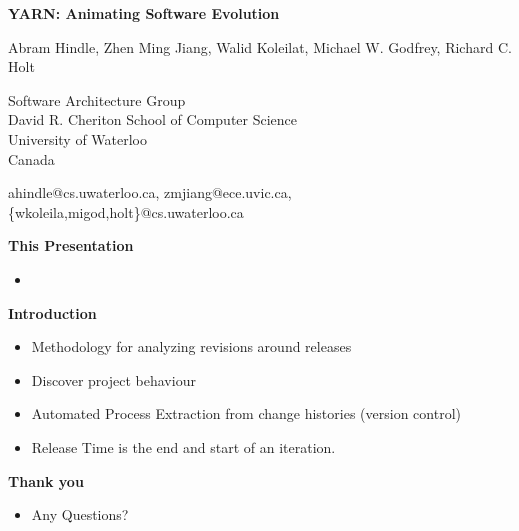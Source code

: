 \documentclass[titlepage,usenames,a4,landscape,semhelv]{seminar}
\title{\large \gettitleproper}
\author{
\names \\ 
{\small Software Architecture Group }\\
\small David R. Cheriton School of Computer Science\\
\small University of Waterloo\\
\small Canada\\
ahindle@cs.uwaterloo.ca, zmjiang@ece.uvic.ca, \{wkoleila,migod,holt\}@cs.uwaterloo.ca
}
\newcommand{\sslide}[1]{ \newslide
	{\huge\bf #1}
}
\newcommand{\gettitle}{
YARN: Animating Software Evolution
}
\newcommand{\names}{Abram Hindle, Zhen Ming Jiang, Walid Koleilat, Michael W. Godfrey, Richard C. Holt}
\begin{document}
\pagestyle{fancy} %
\begin{slide}

\begin{center}
{\bf \LARGE \gettitle }

{\names } 

{\small Software Architecture Group }\\[-.5em]
{\small David R. Cheriton School of Computer Science}\\[-.5em]
{\small University of Waterloo}\\[-.5em]
{\small Canada}

ahindle@cs.uwaterloo.ca, zmjiang@ece.uvic.ca, \{wkoleila,migod,holt\}@cs.uwaterloo.ca


\end{center}

\sslide{This Presentation}
\begin{itemize}
\item 
\end{itemize}
\sslide{Introduction}
\begin{itemize}
\item Methodology for analyzing revisions around releases
\item Discover project behaviour
\item Automated Process Extraction from change histories (version control)
\item Release Time is the end and start of an iteration.


\end{itemize}
\sslide{Thank you}
\begin{itemize}
\item Any Questions?


\end{itemize}
%
%

\end{slide}
\end{document}
